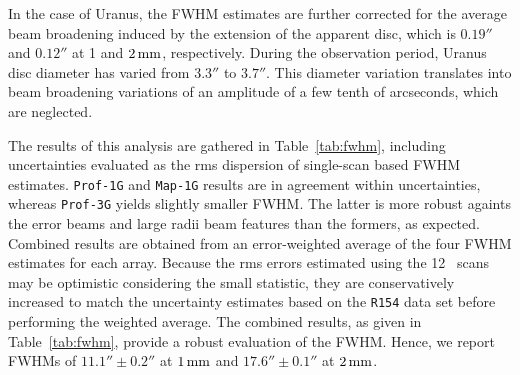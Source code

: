 In the case of Uranus, the FWHM estimates are further corrected for
the {\lp average beam broadening induced by the extension of the
apparent disc, which is $0.19''$ and $0.12''$ at 1 and $2\,\rm{mm}$,
respectively.}
{\lp During the observation period, Uranus disc diameter has varied
from $3.3''$ to $3.7''$. This diameter variation translates into beam
broadening variations of an amplitude of a few tenth of arcseconds,
which are neglected.}  

The results of this analysis are
gathered in Table~\ref{tab:fwhm}, including uncertainties evaluated as
the rms dispersion of single-scan based FWHM estimates.
{\tt Prof-1G} and {\tt Map-1G} results are in agreement within
uncertainties, whereas {\tt Prof-3G} yields slightly smaller FWHM.
{\lp The latter is more robust againts the error beams and large radii
beam features than the formers, as expected.}
Combined results are obtained from an error-weighted
average of the four FWHM estimates for each array.
Because the rms errors estimated using the 12 \bm\ scans may be
optimistic considering the small statistic, they are conservatively
increased to match the uncertainty estimates based on the {\tt R154}
data set before performing the weighted average.  
The combined results, as given in
Table~\ref{tab:fwhm}, provide a robust evaluation of the
FWHM. Hence, we report FWHMs of $11.1'' \pm 0.2''$ at
$1\, \rm{mm}$ and $17.6''\pm 0.1''$ at $2\, \rm{mm}$.  


